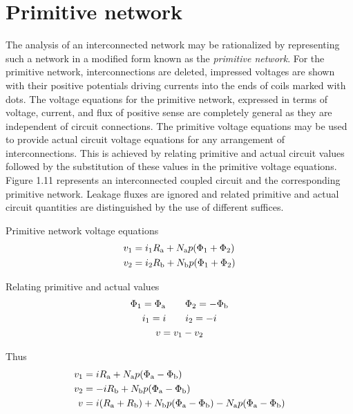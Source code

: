 \documentclass[a4paper,numbers=noenddot,12pt]{scrbook}
\begin{document}
        \section{Primitive network}
        The analysis of an interconnected network may be rationalized by representing such a network in a modified form known as the \textit{primitive network}. For the primitive network, interconnections are deleted, impressed voltages are shown with their positive potentials driving currents into the ends of coils marked with dots. The voltage equations for the primitive network, expressed in terms of voltage, current, and flux of positive sense are completely general as they are independent of circuit connections. 
        The primitive voltage equations may be used to provide actual circuit voltage equations for any arrangement of interconnections. This is achieved by relating primitive and actual circuit values followed by the substitution of these values in the primitive voltage equations. 
        Figure 1.11 represents an interconnected coupled circuit and the corresponding primitive network. Leakage fluxes are ignored and related primitive and actual circuit quantities are distinguished by the use of different suffices.

        Primitive network voltage equations
        \begin{align*}
            v_1 & = i_1 R_\textup{a} + N_\textup{a} p (\Phi_1 + \Phi_2) \\
            v_2 & = i_2 R_\textup{b} + N_\textup{b} p (\Phi_1 + \Phi_2) \\ 
        \end{align*}

        Relating primitive and actual values
        \begin{gather*}
            \Phi_1 = \Phi_\textup{a} \qquad \Phi_2 = - \Phi_\textup{b} \\
            i_1 = i \qquad i_2 = -i \\
            v = v_1 - v_2
        \end{gather*}

        Thus
        \begin{align*}
            v_1 & = i R_\textup{a} + N_\textup{a} p (\Phi_\textup{a} - \Phi_\textup{b}) \\
            v_2 & = -i R_\textup{b} + N_\textup{b} p (\Phi_\textup{a} - \Phi_\textup{b}) \\
            v & = i (R_\textup{a} + R_\textup{b}) + N_\textup{b} p (\Phi_\textup{a} - \Phi_\textup{b}) - N_\textup{a} p (\Phi_\textup{a} - \Phi_\textup{b})
        \end{align*}
\end{document}
